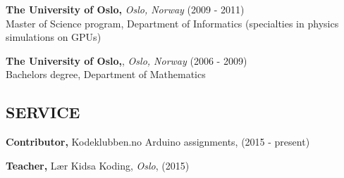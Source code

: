 \documentclass{article}
\begin{document}
\begin{addmargin}[2em]{0em}
  {\bf The University of Oslo,}  {\it Oslo, Norway} (2009 - 2011) \\
  Master of Science program, Department of Informatics (specialties in physics simulations on GPUs)

  {\bf The University of Oslo,}, {\it Oslo, Norway} (2006 - 2009) \\
  Bachelors degree, Department of Mathematics
\end{addmargin}

\subsection*{SERVICE}

\begin{addmargin}[2em]{0em}
  {\bf Contributor,} Kodeklubben.no Arduino assignments, (2015 - present)

  {\bf Teacher,} L\ae r Kidsa Koding, {\it Oslo}, (2015)
\end{addmargin}
\end{document}
